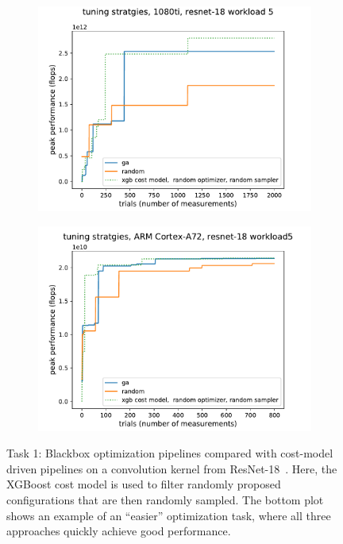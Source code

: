 \begin{figure}[tb]
\begin{center}
\begin{subfigure}[]{\textwidth}
\includegraphics[width=\textwidth]{sys_figures/blackbox1080tiresnet-18_5_.pdf}
\end{subfigure}
\end{center}
\begin{center}
\begin{subfigure}[]{\textwidth}
\includegraphics[width=\textwidth]{sys_figures/blackboxrk3399_resnet-18_5_.pdf}
\end{subfigure}
\end{center}
\caption{Task 1: Blackbox optimization pipelines compared with cost-model driven pipelines on a convolution kernel from ResNet-18~\cite{he2016deep}. Here, the XGBoost cost model is used to filter randomly proposed configurations that are then randomly sampled. The bottom plot shows an example of an ``easier'' optimization task, where all three approaches quickly achieve good performance.}
\label{fig:blackbox}
\end{figure}

